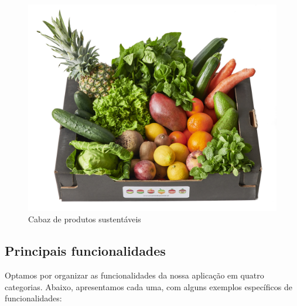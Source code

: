 \begin{figure}[H]
  \centering
  \includegraphics[scale=0.10]{Figures/0. General/cabaz.jpg}
  \caption{Cabaz de produtos sustentáveis}
  \label{Cabaz de produtos sustentáveis}
\end{figure}

\newpage

\subsection{Principais funcionalidades}
Optamos por organizar as funcionalidades da nossa aplicação em quatro categorias. Abaixo, apresentamos cada uma, com alguns exemplos específicos de funcionalidades:

\vspace{6pt}

